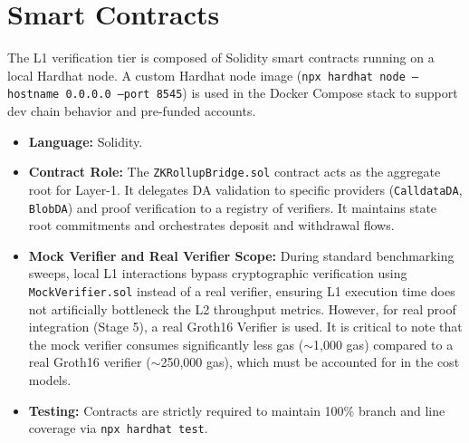 \section{Smart Contracts}
\label{sec:smart_contracts}
The L1 verification tier is composed of Solidity smart contracts running on a local Hardhat node. A custom Hardhat node image (\texttt{npx hardhat node --hostname 0.0.0.0 --port 8545}) is used in the Docker Compose stack to support dev chain behavior and pre-funded accounts.

\begin{itemize}
    \item \textbf{Language:} Solidity.
    \item \textbf{Contract Role:} The \texttt{ZKRollupBridge.sol} contract acts as the aggregate root for Layer-1. It delegates DA validation to specific providers (\texttt{CalldataDA}, \texttt{BlobDA}) and proof verification to a registry of verifiers. It maintains state root commitments and orchestrates deposit and withdrawal flows.
    \item \textbf{Mock Verifier and Real Verifier Scope:} During standard benchmarking sweeps, local L1 interactions bypass cryptographic verification using \texttt{MockVerifier.sol} instead of a real verifier, ensuring L1 execution time does not artificially bottleneck the L2 throughput metrics. However, for real proof integration (Stage 5), a real Groth16 Verifier is used. It is critical to note that the mock verifier consumes significantly less gas ($\sim$1,000 gas) compared to a real Groth16 verifier ($\sim$250,000 gas), which must be accounted for in the cost models.
    \item \textbf{Testing:} Contracts are strictly required to maintain 100\% branch and line coverage via \texttt{npx hardhat test}.
\end{itemize}